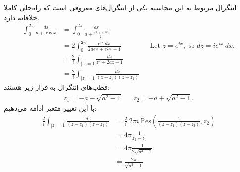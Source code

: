 \label{appendix:activity_calculation}
انتگرال مربوط به این محاسبه یکی از انتگرال‌های معروفی است که راه‌حلی کاملا خلاقانه دارد.
\begin{align*}
	\int_0^{2 \pi
	} \frac{dx}{a + \cos x}  &= \int_0^{2 \pi} \frac{dx}{a + \frac{e^{ix} + e^{-ix}}{2}}  \\
	&= 2\int_0^{2 \pi} \frac{e^{ix} \ dx}{2ae^{ix} + e^{2ix} + 1} && \text{Let } z=e^{ix}, \text{ so } dz = ie^{ix} \ dx. \\
	&= \frac{2}{i} \int_{|z|=1} \frac{dz}{z^2 + 2az + 1} \\
	&= \frac{2}{i} \int_{|z|=1} \frac{dz}{(z-z_1)(z-z_2)}
\end{align*}
قطب‌های انتگرال به قرار زیر هستند:
\begin{align*} z_1 = -a - \sqrt{a^2-1}  && z_2 = -a + \sqrt{a^2-1}.
\end{align*}
با این تغییر متغیر ادامه می‌دهیم:
\begin{align*}
	\frac{2}{i} \int_{|z|=1} \frac{dz}{(z-z_1)(z-z_2)}
	&= \frac{2}{i} \ 2 \pi i \ \mathrm{Res}\left( \frac{1}{(z-z_1)(z-z_2)}, z_2\right) \\
	&= 4 \pi \frac{1}{z_2 - z_1} \\
	&= 4 \pi \frac{1}{2 \sqrt{a^2 -1}} \\
	&= \frac{2 \pi}{\sqrt{a^2-1}}.
\end{align*}